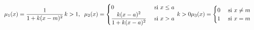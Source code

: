 \documentclass[10pt]{article}
\begin{document}
\[\mu_1(x)=\dfrac{1}{1+k(x-m)^2}\, k>1,\;\;
\mu_2(x)=\begin{cases}
0 & \mbox{ si } x \leq a\\
\dfrac{k(x - a) ^ 2}{1+k(x - a) ^ 2} & \mbox{ si } x > a
\end{cases}\,  k > 0\\
\mu_3(x)=\begin{cases}
0 & \mbox{ si } x\neq m\\
1 & \mbox{ si } x = m
\end{cases}\]
\end{document}
